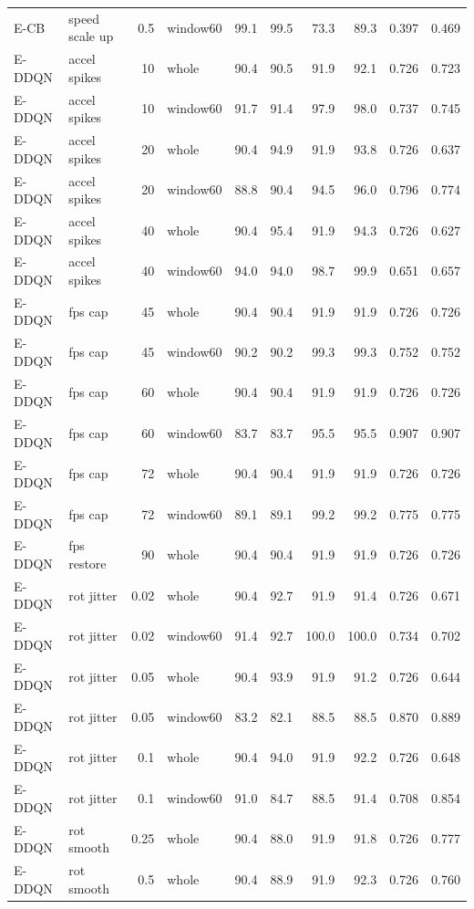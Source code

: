 \begin{longtable}{llrlrrrrrr}
E-CB & speed scale up & 0.5 & window60 & 99.1 & 99.5 & 73.3 & 89.3 & 0.397 & 0.469 \\
E-DDQN & accel spikes & 10 & whole & 90.4 & 90.5 & 91.9 & 92.1 & 0.726 & 0.723 \\
E-DDQN & accel spikes & 10 & window60 & 91.7 & 91.4 & 97.9 & 98.0 & 0.737 & 0.745 \\
E-DDQN & accel spikes & 20 & whole & 90.4 & 94.9 & 91.9 & 93.8 & 0.726 & 0.637 \\
E-DDQN & accel spikes & 20 & window60 & 88.8 & 90.4 & 94.5 & 96.0 & 0.796 & 0.774 \\
E-DDQN & accel spikes & 40 & whole & 90.4 & 95.4 & 91.9 & 94.3 & 0.726 & 0.627 \\
E-DDQN & accel spikes & 40 & window60 & 94.0 & 94.0 & 98.7 & 99.9 & 0.651 & 0.657 \\
E-DDQN & fps cap & 45 & whole & 90.4 & 90.4 & 91.9 & 91.9 & 0.726 & 0.726 \\
E-DDQN & fps cap & 45 & window60 & 90.2 & 90.2 & 99.3 & 99.3 & 0.752 & 0.752 \\
E-DDQN & fps cap & 60 & whole & 90.4 & 90.4 & 91.9 & 91.9 & 0.726 & 0.726 \\
E-DDQN & fps cap & 60 & window60 & 83.7 & 83.7 & 95.5 & 95.5 & 0.907 & 0.907 \\
E-DDQN & fps cap & 72 & whole & 90.4 & 90.4 & 91.9 & 91.9 & 0.726 & 0.726 \\
E-DDQN & fps cap & 72 & window60 & 89.1 & 89.1 & 99.2 & 99.2 & 0.775 & 0.775 \\
E-DDQN & fps restore & 90 & whole & 90.4 & 90.4 & 91.9 & 91.9 & 0.726 & 0.726 \\
E-DDQN & rot jitter & 0.02 & whole & 90.4 & 92.7 & 91.9 & 91.4 & 0.726 & 0.671 \\
E-DDQN & rot jitter & 0.02 & window60 & 91.4 & 92.7 & 100.0 & 100.0 & 0.734 & 0.702 \\
E-DDQN & rot jitter & 0.05 & whole & 90.4 & 93.9 & 91.9 & 91.2 & 0.726 & 0.644 \\
E-DDQN & rot jitter & 0.05 & window60 & 83.2 & 82.1 & 88.5 & 88.5 & 0.870 & 0.889 \\
E-DDQN & rot jitter & 0.1 & whole & 90.4 & 94.0 & 91.9 & 92.2 & 0.726 & 0.648 \\
E-DDQN & rot jitter & 0.1 & window60 & 91.0 & 84.7 & 88.5 & 91.4 & 0.708 & 0.854 \\
E-DDQN & rot smooth & 0.25 & whole & 90.4 & 88.0 & 91.9 & 91.8 & 0.726 & 0.777 \\
E-DDQN & rot smooth & 0.5 & whole & 90.4 & 88.9 & 91.9 & 92.3 & 0.726 & 0.760 \\

\end{longtable}
